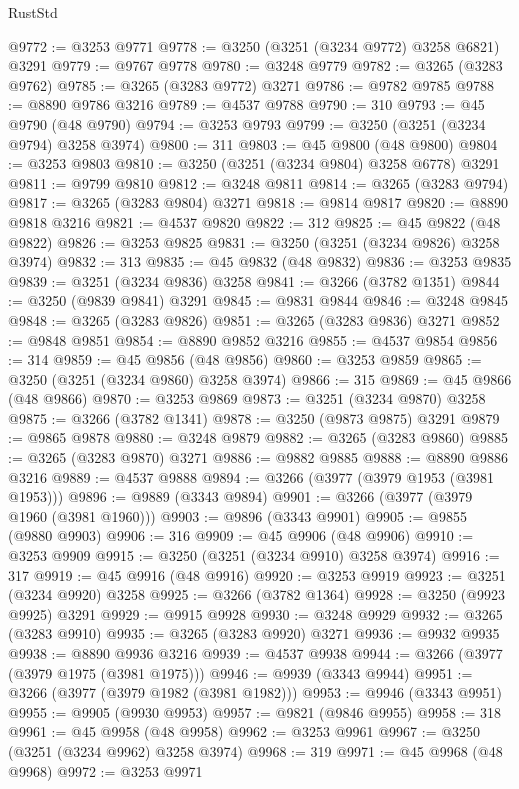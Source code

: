 \begin{lexlean}{RustStd}
\begin{coremodule}
@9772 := @3253 @9771
@9778 := @3250 (@3251 (@3234 @9772) @3258 @6821) @3291
@9779 := @9767 @9778
@9780 := @3248 @9779
@9782 := @3265 (@3283 @9762)
@9785 := @3265 (@3283 @9772) @3271
@9786 := @9782 @9785
@9788 := @8890 @9786 @3216
@9789 := @4537 @9788
@9790 := 310
@9793 := @45 @9790 (@48 @9790)
@9794 := @3253 @9793
@9799 := @3250 (@3251 (@3234 @9794) @3258 @3974)
@9800 := 311
@9803 := @45 @9800 (@48 @9800)
@9804 := @3253 @9803
@9810 := @3250 (@3251 (@3234 @9804) @3258 @6778) @3291
@9811 := @9799 @9810
@9812 := @3248 @9811
@9814 := @3265 (@3283 @9794)
@9817 := @3265 (@3283 @9804) @3271
@9818 := @9814 @9817
@9820 := @8890 @9818 @3216
@9821 := @4537 @9820
@9822 := 312
@9825 := @45 @9822 (@48 @9822)
@9826 := @3253 @9825
@9831 := @3250 (@3251 (@3234 @9826) @3258 @3974)
@9832 := 313
@9835 := @45 @9832 (@48 @9832)
@9836 := @3253 @9835
@9839 := @3251 (@3234 @9836) @3258
@9841 := @3266 (@3782 @1351)
@9844 := @3250 (@9839 @9841) @3291
@9845 := @9831 @9844
@9846 := @3248 @9845
@9848 := @3265 (@3283 @9826)
@9851 := @3265 (@3283 @9836) @3271
@9852 := @9848 @9851
@9854 := @8890 @9852 @3216
@9855 := @4537 @9854
@9856 := 314
@9859 := @45 @9856 (@48 @9856)
@9860 := @3253 @9859
@9865 := @3250 (@3251 (@3234 @9860) @3258 @3974)
@9866 := 315
@9869 := @45 @9866 (@48 @9866)
@9870 := @3253 @9869
@9873 := @3251 (@3234 @9870) @3258
@9875 := @3266 (@3782 @1341)
@9878 := @3250 (@9873 @9875) @3291
@9879 := @9865 @9878
@9880 := @3248 @9879
@9882 := @3265 (@3283 @9860)
@9885 := @3265 (@3283 @9870) @3271
@9886 := @9882 @9885
@9888 := @8890 @9886 @3216
@9889 := @4537 @9888
@9894 := @3266 (@3977 (@3979 @1953 (@3981 @1953)))
@9896 := @9889 (@3343 @9894)
@9901 := @3266 (@3977 (@3979 @1960 (@3981 @1960)))
@9903 := @9896 (@3343 @9901)
@9905 := @9855 (@9880 @9903)
@9906 := 316
@9909 := @45 @9906 (@48 @9906)
@9910 := @3253 @9909
@9915 := @3250 (@3251 (@3234 @9910) @3258 @3974)
@9916 := 317
@9919 := @45 @9916 (@48 @9916)
@9920 := @3253 @9919
@9923 := @3251 (@3234 @9920) @3258
@9925 := @3266 (@3782 @1364)
@9928 := @3250 (@9923 @9925) @3291
@9929 := @9915 @9928
@9930 := @3248 @9929
@9932 := @3265 (@3283 @9910)
@9935 := @3265 (@3283 @9920) @3271
@9936 := @9932 @9935
@9938 := @8890 @9936 @3216
@9939 := @4537 @9938
@9944 := @3266 (@3977 (@3979 @1975 (@3981 @1975)))
@9946 := @9939 (@3343 @9944)
@9951 := @3266 (@3977 (@3979 @1982 (@3981 @1982)))
@9953 := @9946 (@3343 @9951)
@9955 := @9905 (@9930 @9953)
@9957 := @9821 (@9846 @9955)
@9958 := 318
@9961 := @45 @9958 (@48 @9958)
@9962 := @3253 @9961
@9967 := @3250 (@3251 (@3234 @9962) @3258 @3974)
@9968 := 319
@9971 := @45 @9968 (@48 @9968)
@9972 := @3253 @9971

\end{coremodule}
\end{lexlean}
